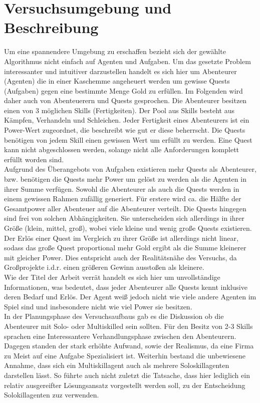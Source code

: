 \documentclass[fleqn,10pt]{SelfArx} %
\begin{document}

\section{Versuchsumgebung und Beschreibung}
\label{sec:Umgebung}

Um eine spannendere Umgebung zu erschaffen bezieht sich der gewählte Algorithmus nicht einfach auf Agenten und Aufgaben. Um das gesetzte Problem interessanter und intuitiver darzustellen handelt es sich hier um Abenteurer (Agenten) die in einer Kaschemme angeheuert werden um gewisse Quests (Aufgaben) gegen eine bestimmte Menge Gold zu erfüllen. Im Folgenden wird daher auch von Abenteuerern und Quests gesprochen. Die Abenteurer besitzen einen von 3 möglichen Skills (Fertigkeiten). Der Pool aus Skills besteht aus Kämpfen, Verhandeln und Schleichen. Jeder Fertigkeit eines Abenteurers ist ein Power-Wert zugeordnet, die beschreibt wie gut er diese beherrscht. Die Quests benötigen von jedem Skill einen gewissen Wert um erfüllt zu werden. Eine Quest kann nicht abgeschlossen werden, solange nicht alle Anforderungen komplett erfüllt worden sind.\\
Aufgrund des Überangebots von Aufgaben existieren mehr Quests als Abenteurer, bzw. benötigen die Quests mehr Power um gelöst zu werden als die Agenten in ihrer Summe verfügen. Sowohl die Abenteurer als auch die Quests werden in einem gewissen Rahmen zufällig generiert. Für erstere wird ca. die Hälfte der Gesamtpower aller Abenteuer auf die Abenteurer verteilt. Die Quests hingegen sind frei von solchen Abhängigkeiten. Sie unterscheiden sich allerdings in ihrer Größe (klein, mittel, groß), wobei viele kleine und wenig große Quests existieren. Der Erlös einer Quest im Vergleich zu ihrer Größe ist allerdings nicht linear, sodass das große Quest proportional mehr Gold ergibt als die Summe kleinerer mit gleicher Power. Dies entspricht auch der Realitätsnähe des Versuchs, da Großprojekte i.d.r. einen größeren Gewinn ausstoßen als kleinere.\\
Wie der Titel der Arbeit verrät handelt es sich hier um unvollständige Informationen, was bedeutet, dass jeder Abenteurer alle Quests kennt inklusive deren Bedarf und Erlös. Der Agent weiß jedoch nicht wie viele andere Agenten im Spiel sind und insbesondere nicht wie viel Power sie besitzen.\\ 
In der Planungsphase des Versuchsaufbaus gab es die Diskussion ob die Abenteurer mit Solo- oder Multiskilled sein sollten. Für den Besitz von 2-3 Skills sprachen eine Interessantere Verhandlungsphase zwischen den Abenteurern. Dagegen standen der stark erhöhte Aufwand, sowie der Realismus, da eine Firma zu Meist auf eine Aufgabe Spezialisiert ist. Weiterhin bestand die unbewiesene Annahme, dass sich ein Multiskillagent auch als mehrere Soloskillagenten darstellen lässt. So führte auch nicht zuletzt die Tatsache, dass hier lediglich ein relativ ausgereifter Lösungsansatz vorgestellt werden soll, zu der Entscheidung Solokillagenten zuz verwenden. \\
\end{document}
